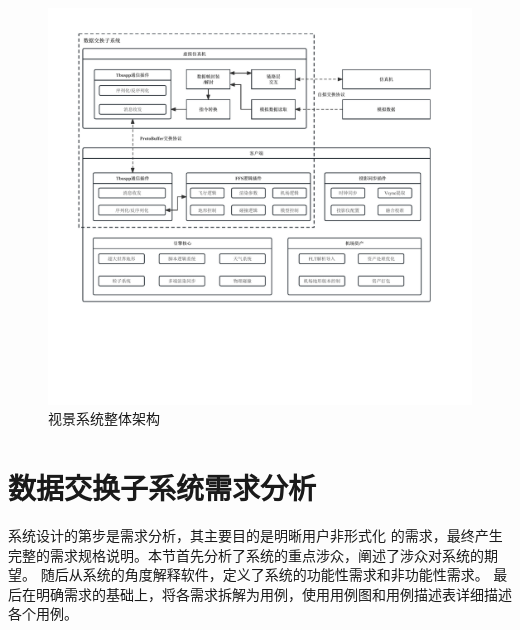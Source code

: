\begin{figure}[h]
    \begin{center}
        \includegraphics[width=\textwidth]{pictures/sketch.pdf}
        \caption{视景系统整体架构}
        \label{framework}
    \end{center}
\end{figure}

\section{数据交换子系统需求分析}
系统设计的第步是需求分析，其主要目的是明晰用户非形式化
的需求，最终产生完整的需求规格说明。本节首先分析了系统的重点涉众，阐述了涉众对系统的期望。
随后从系统的角度解释软件，定义了系统的功能性需求和非功能性需求。
最后在明确需求的基础上，将各需求拆解为用例，使用用例图和用例描述表详细描述各个用例。

